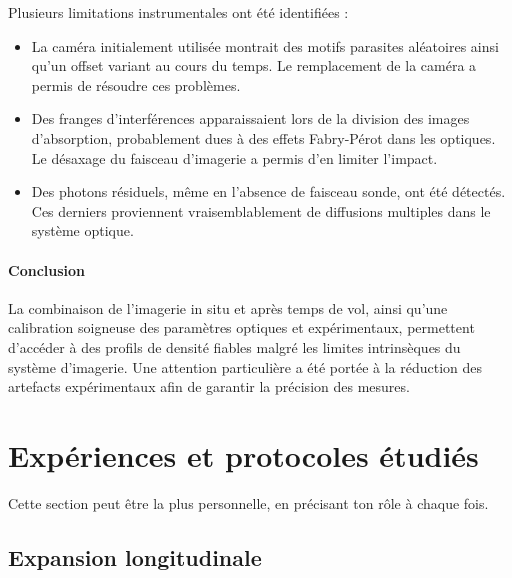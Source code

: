 Plusieurs limitations instrumentales ont été identifiées :
\begin{itemize}[label = $\bullet$]
    \item La caméra initialement utilisée montrait des motifs parasites aléatoires ainsi qu’un offset variant au cours du temps. Le remplacement de la caméra a permis de résoudre ces problèmes.
    \item Des franges d’interférences apparaissaient lors de la division des images d’absorption, probablement dues à des effets Fabry-Pérot dans les optiques. Le désaxage du faisceau d’imagerie a permis d’en limiter l’impact.
    \item Des photons résiduels, même en l’absence de faisceau sonde, ont été détectés. Ces derniers proviennent vraisemblablement de diffusions multiples dans le système optique.
\end{itemize}

\paragraph{Conclusion}

La combinaison de l’imagerie in situ et après temps de vol, ainsi qu’une calibration soigneuse des paramètres optiques et expérimentaux, permettent d’accéder à des profils de densité fiables malgré les limites intrinsèques du système d’imagerie. Une attention particulière a été portée à la réduction des artefacts expérimentaux afin de garantir la précision des mesures.


%


\section{Expériences et protocoles étudiés}
Cette section peut être la plus personnelle, en précisant ton rôle à chaque fois.
\subsection{Expansion longitudinale}

